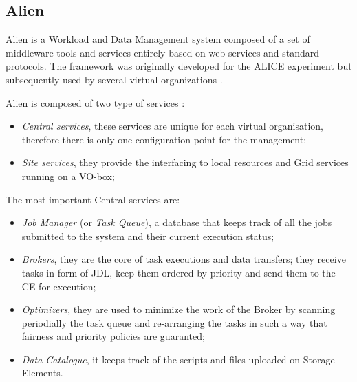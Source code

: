 \subsection{Alien}
Alien is a Workload and Data Management system composed of a 	set of middleware tools and services entirely based on web-services and standard protocols. The framework was originally developed for the ALICE experiment \cite{Alice1995} but subsequently used by several virtual organizations \cite{McClatechey2003,GPCALMA}. 

Alien is composed of two type of services \cite{Bagnasco2010}:
\begin{itemize}
\item
\emph{Central services}, these services are unique for each virtual organisation, therefore there is only one  configuration point for the management;
\item \emph{Site services}, they provide the interfacing to local resources and Grid services running on a VO-box;
\end{itemize}

The most important Central services are:
\begin{itemize}
\item \emph{Job Manager} (or \emph{Task Queue}), a database that keeps track of all the jobs submitted to the system and their current execution status;
\item \emph{Brokers}, they are the core of task executions and data transfers; they receive tasks in form of JDL,  keep them ordered by priority and send them to the CE for execution;
\item \emph{Optimizers}, they are used to minimize the work of the Broker by scanning periodially the task queue and re-arranging the tasks in such a way that fairness and priority policies are guaranted;
\item \emph{Data Catalogue}, it keeps track of the scripts and files uploaded on Storage Elements.
\end{itemize}



